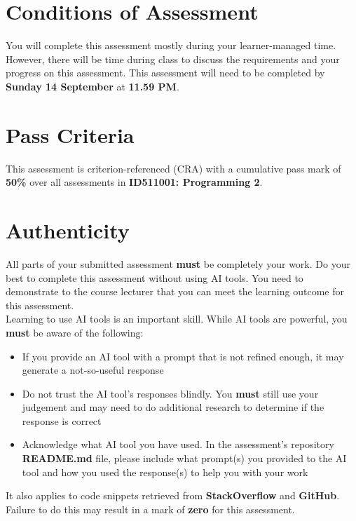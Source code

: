 \documentclass{article}
\begin{document}
\section*{Conditions of Assessment}
You will complete this assessment mostly during your learner-managed time. However, there will be time during class to discuss the requirements and your progress on this assessment. This assessment will need to be completed by  \textbf{Sunday 14 September} at \textbf{11.59 PM}. 

\section*{Pass Criteria}
This assessment is criterion-referenced (CRA) with a cumulative pass mark of \textbf{50\%} over all assessments in \textbf{ID511001: Programming 2}.

\section*{Authenticity}
All parts of your submitted assessment \textbf{must} be completely your work. Do your best to complete this assessment without using  AI tools. You need to demonstrate to the course lecturer that you can meet the learning outcome for this assessment. \\
 
Learning to use AI tools is an important skill. While AI tools are powerful, you \textbf{must} be aware of the following:

\begin{itemize}
    \item If you provide an AI tool with a prompt that is not refined enough, it may generate a not-so-useful response
    \item Do not trust the AI tool's responses blindly. You \textbf{must} still use your judgement and may need to do additional research to determine if the response is correct
    \item Acknowledge what AI tool you have used. In the assessment's repository \textbf{README.md} file, please include what prompt(s) you provided to the AI tool and how you used the response(s) to help you with your work
\end{itemize}

It also applies to code snippets retrieved from \textbf{StackOverflow} and \textbf{GitHub}. \\
 
Failure to do this may result in a mark of \textbf{zero} for this assessment.
\end{document}
